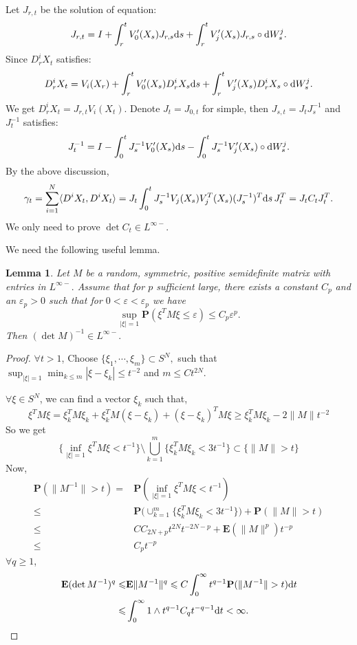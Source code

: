 \documentclass[twoside, 12pt]{book}
\numberwithin{equation}{chapter}
\newtheorem{lemma}[theorem]{Lemma}
\def\bE{{\mathbf E}}
\def\bP{{\mathbf P}}
\def\<{\langle}
\def\>{\rangle}
\def\geq{\geqslant}
\def\leq{\leqslant}
\def\d{\text{\rm{d}}}
\def\eps{\varepsilon}
\begin{document}
	Let $J_{r,t}$ be the solution of equation: 
	\begin{align}
		J_{r,t}=I+\int_r^t V'_0(X_s) J_{r,s}\d s+\int_r^t V'_j(X_s) J_{r,s}\circ \d W^j_s. 
	\end{align}
	Since $D^i_rX_t$ satisfies: 
	$$D^i_rX_t=V_i(X_r)+\int_r^t V'_0(X_s) D^i_r X_s \d s+\int_r^t V'_j(X_s)D^i_rX_s\circ \d W^j_s. $$
	We get $D^i_rX_t=J_{r,t} V_i(X_t)$. Denote $J_t=J_{0,t}$ for simple, then $J_{s,t}=J_{t}J_{s}^{-1}$ and $J_{t}^{-1}$ satisfies: 
	$$J_t^{-1}=I-\int_0^t J_s^{-1} V'_0(X_s)\d s-\int_0^t J_s^{-1} V'_j(X_s)\circ\d W_s^j. $$
	By the above discussion, 
	$$
	\gamma_t = \sum_{i=1}^N\<D^i X_t, D^i X_t\>=J_t\int_0^t J^{-1}_s V_j(X_s)V^{T}_j(X_s)(J^{-1}_s)^T \d s \,J^T_t=J_t C_t J^T_t. 
	$$
	We only need to prove $\det C_t\in L^{\infty-}$. 
	
	We need the following useful lemma. 
	
	\begin{lemma}\label{Tail}
	Let $M$ be a random, symmetric, positive semidefinite matrix with entries in  $L^{\infty-}.$ Assume that for $p$ sufficient large, there exists a constant $C_p$ and an $\eps_p > 0$ such that
	for $0<\eps<\eps_p$ we have
	$$ \sup_{|\xi|=1}\bP  (\xi^T M \xi\leq \eps)\leq C_p \eps^p. $$
	Then $(\det M)^{-1} \in L^{\infty-}. $
	\end{lemma}
	
	\begin{proof}
		$\forall t>1$, 
		Choose $\{\xi_1,\cdots, \xi_m\}\subset S^N,$ such that $\sup_{|\xi|=1}\min_{k\leq m} |\xi-\xi_k|\leq t^{-2}$ and $m\leq C t^{2N}$. 
		
		$\forall \xi\in S^N$, we can find a vector $\xi_k$ such that,  
		$$\xi^T M\xi = \xi_k^T M\xi_k +\xi_k^TM(\xi-\xi_k)+(\xi-\xi_k)^TM\xi\geq  \xi_k^T M\xi_k-2\|M\|t^{-2}$$
		So we get 
		$$\{\inf_{|\xi|=1} \xi^T M\xi<t^{-1}\}\setminus \bigcup_{k=1}^m \{\xi_k^T M\xi_k<3t^{-1}\}\subset \{ \|M\|>t\}$$
		Now, 
		\begin{equation*}
			\begin{split}
				\bP (\|M^{-1}\|>t)=&\bP  (\inf_{|\xi|=1} \xi^T M\xi<t^{-1})\\
				\leq &\bP \Big( \cup_{k=1}^m \{\xi_k^T M\xi_k<3t^{-1}\}\Big)+\bP (\|M\|>t)\\
				\leq& CC_{2N+p}t^{2N} t^{-2N-p}+\bE  (\|M\|^p)t^{-p}\\
				\leq & C_p t^{-p}
			\end{split}
		\end{equation*}
		$\forall q\geq 1$, 
		\begin{align*}
			\bE  (\det M^{-1})^q\leq& \bE \|M^{-1}\|^q\leq C \int_0^\infty t^{q-1} \bP (\|M^{-1}\|>t)\d t\\\leq& \int_0^\infty 1\wedge t^{q-1}C_{q}  t^{-q-1}\d t<\infty. 
		\end{align*}
	\end{proof}
	
\end{document}
